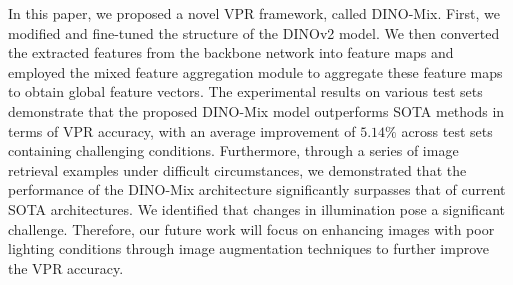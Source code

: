 %
In this paper, we proposed a novel VPR framework, called DINO-Mix. First, we modified and fine-tuned the structure of the DINOv2 model. We then converted the extracted features from the backbone network into feature maps and employed the mixed feature aggregation module to aggregate these feature maps to obtain global feature vectors. The experimental results on various test sets demonstrate that the proposed DINO-Mix model outperforms SOTA methods in terms of VPR accuracy, with an average improvement of $5.14\%$ across test sets containing challenging conditions. Furthermore, through a series of image retrieval examples under difficult circumstances, we demonstrated that the performance of the DINO-Mix architecture significantly surpasses that of current SOTA architectures. We identified that changes in illumination pose a significant challenge. Therefore, our future work will focus on enhancing images with poor lighting conditions through image augmentation techniques to further improve the VPR accuracy.